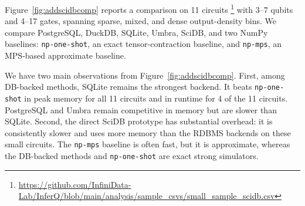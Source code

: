 \medskip
{}
Figure~\ref{fig:addscidbcomp} reports a comparison on 11 \sys circuits \footnote{\url{https://github.com/InfiniData-Lab/InferQ/blob/main/analysis/sample_csvs/small_sample_scidb.csv}} with
3--7 qubits and 4--17 gates, spanning sparse, mixed, and dense output-density bins.
We compare PostgreSQL, DuckDB, SQLite, Umbra, SciDB, and two NumPy baselines:
\texttt{np-one-shot}, an exact tensor-contraction baseline, and \texttt{np-mps}, an
MPS-based approximate baseline. 

\medskip
{}
We have two main observations from Figure~\ref{fig:addscidbcomp}. First, among DB-backed
methods, SQLite remains the strongest backend. It beats
\texttt{np-one-shot} in peak memory for all 11 circuits and in runtime for 4 of the
11 circuits. PostgreSQL and Umbra remain competitive in memory but are slower than
SQLite. Second, the direct SciDB prototype has substantial overhead: it is consistently
slower and uses more memory than the RDBMS backends on these small circuits. The
\texttt{np-mps} baseline is often fast, but it is approximate, whereas the DB-backed
methods and \texttt{np-one-shot} are exact strong simulators.

\medskip
  \vspace{0.2cm}
\noindent
\setlength{\fboxsep}{6pt}










